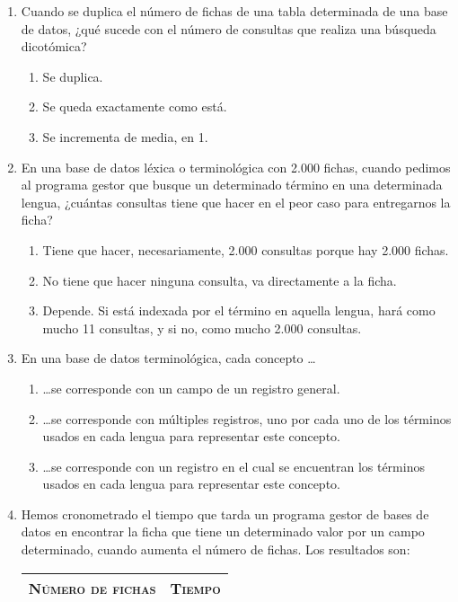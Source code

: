 \begin{enumerate}
\item Cuando se duplica el número de fichas de una tabla determinada de una base de datos, ¿qué sucede con el número de consultas que realiza una búsqueda dicotómica? \begin{enumerate} \item Se duplica. \item Se queda exactamente como está. \item Se incrementa de media, en 1. \end{enumerate} 

\item En una base de datos léxica o terminológica con 2.000 fichas, cuando pedimos al programa gestor que busque un determinado término en una determinada lengua, ¿cuántas consultas tiene que hacer en el peor caso para entregarnos la ficha? \begin{enumerate} \item Tiene que hacer, necesariamente, 2.000 consultas porque hay 2.000 fichas. \item No tiene que hacer ninguna consulta, va directamente a la ficha. \item Depende. Si está indexada por el término en aquella lengua, hará como mucho 11 consultas, y si no, como mucho 2.000 consultas. \end{enumerate} 

\item En una base de datos terminológica, cada concepto \ldots\begin{enumerate} \item \ldots se corresponde con un campo de un registro general. \item \ldots se corresponde con múltiples registros, uno por cada uno de los términos usados en cada lengua para representar este concepto. \item \ldots se corresponde con un registro en el cual se encuentran los términos usados en cada lengua para representar este concepto. \end{enumerate} 

\item Hemos cronometrado el tiempo que tarda un programa gestor de bases de datos en encontrar la ficha que tiene un determinado valor por un campo determinado, cuando aumenta el número de fichas. Los resultados son: \begin{center} \begin{tabular}{c|c} \hline\hline \textsc{Número de fichas} &\textsc{Tiempo} \\ \hline


\end{tabular}
\end{center}
\end{enumerate}
